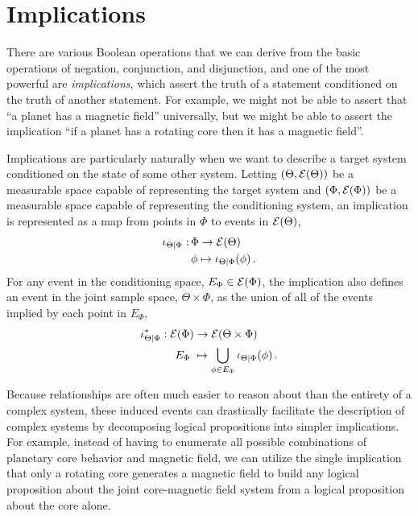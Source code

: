 \section{Implications}

There are various Boolean operations that we can derive from the basic 
operations of negation, conjunction, and disjunction, and one of the most
powerful are \emph{implications}, which assert the truth of a statement
conditioned on the truth of another statement.  For example, we might not 
be able to assert that ``a planet has a magnetic field'' universally, but we 
might be able to assert the implication ``if a planet has a rotating core then 
it has a magnetic field''.

Implications are particularly naturally when we want to describe a target
system conditioned on the state of some other system.  Letting 
$\left(\Theta,  \mathcal{E} \! \left( \Theta \right)  \right)$ be a measurable space capable of 
representing the target system and $\left(\Phi,  \mathcal{E} \! \left( \Phi \right)  \right)$ be a 
measurable space capable of representing the conditioning system, an 
implication is represented as a map from points in $\Phi$ to events in 
$ \mathcal{E} \! \left( \Theta \right) $,
%
\begin{align*}
\iota_{\Theta \mid \Phi} :& \, \Phi \rightarrow  \mathcal{E} \! \left( \Theta \right) 
\\
& \, \phi \mapsto \iota_{\Theta \mid \Phi} \! \left( \phi \right).
\end{align*}
%
For any event in the conditioning space, $E_{\Phi} \in  \mathcal{E} \! \left( \Phi \right) $,
the implication also defines an event in the joint sample space, 
$\Theta \times \Phi$, as the union of all of the events implied by each 
point in $E_{\Phi}$,
%
\begin{align*}
\iota^{*}_{\Theta \mid \Phi} 
&:  \mathcal{E} \! \left( \Phi \right)  \rightarrow  \mathcal{E} \! \left( \Theta \times \Phi \right) 
\\
& \quad \; E_{\Phi} \; \mapsto
\bigcup_{\phi \in E_{\Phi} } \iota_{\Theta \mid \Phi} \! \left( \phi \right).
\end{align*}

Because relationships are often much easier to reason about than the 
entirety of a complex system, these induced events can drastically facilitate
the description of complex systems by decomposing logical propositions 
into simpler implications.  For example, instead of having to enumerate all 
possible combinations of planetary core behavior and magnetic field, we 
can utilize the single implication that only a rotating core generates a 
magnetic field to build any logical proposition about the joint core-magnetic 
field system from a logical proposition about the core alone.  

